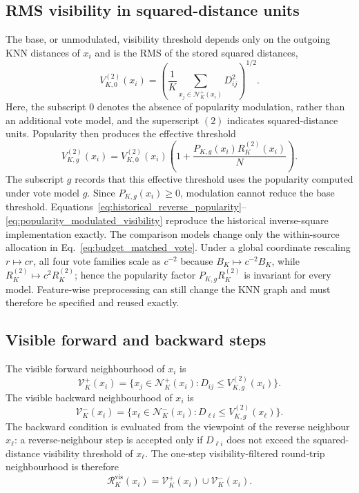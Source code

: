 \documentclass[pdflatex,sn-mathphys-num]{sn-jnl}
\newcommand{\calN}{\mathcal{N}}
\newcommand{\calR}{\mathcal{R}}
\newcommand{\calV}{\mathcal{V}}
\begin{document}
\subsection{RMS visibility in squared-distance units}

The base, or unmodulated, visibility threshold depends only on the outgoing
KNN distances of $x_i$ and is the RMS of the stored squared distances,
\begin{equation}
V_{K,0}^{(2)}(x_i)=
\left(
\frac{1}{K}
\sum_{x_j\in\calN_K^+(x_i)}D_{ij}^{2}
\right)^{1/2}.
\label{eq:rms_visibility_base}
\end{equation}
Here, the subscript $0$ denotes the absence of popularity modulation, rather
than an additional vote model, and the superscript $(2)$ indicates
squared-distance units.
Popularity then produces the effective threshold
\begin{equation}
V_{K,g}^{(2)}(x_i)=V_{K,0}^{(2)}(x_i)
\left(1+\frac{P_{K,g}(x_i)R_K^{(2)}(x_i)}{N}\right).
\label{eq:popularity_modulated_visibility}
\end{equation}
The subscript $g$ records that this effective threshold uses the popularity
computed under vote model $g$.  Since $P_{K,g}(x_i)\geq0$, modulation cannot
reduce the base threshold.
Equations~\eqref{eq:historical_reverse_popularity}--\eqref{eq:popularity_modulated_visibility} reproduce the historical inverse-square implementation exactly. The comparison models change only the within-source allocation in Eq.~\eqref{eq:budget_matched_vote}. Under a global coordinate rescaling $r\mapsto cr$, all four vote families scale as $c^{-2}$ because $B_K\mapsto c^{-2}B_K$, while $R_K^{(2)}\mapsto c^2R_K^{(2)}$; hence the popularity factor $P_{K,g}R_K^{(2)}$ is invariant for every model. Feature-wise preprocessing can still change the KNN graph and must therefore be specified and reused exactly.

\subsection{Visible forward and backward steps}

The visible forward neighbourhood of $x_i$ is
\begin{equation}
\calV_K^+(x_i)=
\{x_j\in\calN_K^+(x_i):D_{ij}\leq V_{K,g}^{(2)}(x_i)\}.
\label{eq:visible_forward}
\end{equation}
The visible backward neighbourhood of $x_i$ is
\begin{equation}
\calV_K^-(x_i)=
\{x_\ell\in\calN_K^-(x_i):D_{\ell i}\leq V_{K,g}^{(2)}(x_\ell)\}.
\label{eq:visible_backward}
\end{equation}
The backward condition is evaluated from the viewpoint of the reverse neighbour $x_\ell$: a reverse-neighbour step is accepted only if $D_{\ell i}$ does not exceed the squared-distance visibility threshold of $x_\ell$. The one-step visibility-filtered round-trip neighbourhood is therefore
\begin{equation}
\calR_K^{\mathrm{vis}}(x_i)=\calV_K^+(x_i)\cup\calV_K^-(x_i).
\label{eq:visible_roundtrip}
\end{equation}
\end{document}
